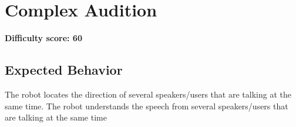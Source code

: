 \section{Complex Audition}

\textbf{Difficulty score: 60}

\subsection{Expected Behavior}
The robot locates the direction of several speakers/users that are talking at the same time.
The robot understands the speech from several speakers/users that are talking at the same time



